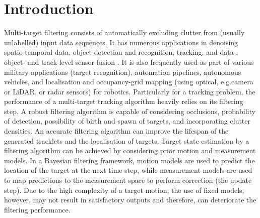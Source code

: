 \documentclass[runningheads]{llncs}
\begin{document}
\section{Introduction}
Multi-target filtering consists of automatically excluding clutter from (usually unlabelled) input data sequences. It has numerous applications in denoising spatio-temporal data, object detection and recognition, tracking, and data-, object- and track-level sensor fusion \cite{Vo:2005,Vo:2014,Fantacci:2018}. It is also frequently used as part of various military applications (target recognition), automation pipelines, autonomous vehicles, and localisation and occupancy-grid mapping (using optical, e.g.\stereo camera or LiDAR, or radar sensors) for robotics.
Particularly for a tracking problem, the performance of a multi-target tracking algorithm heavily relies on its filtering step. A robust filtering algorithm
is capable of considering occlusions, probability of detection, possibility of birth and spawn of targets, and incorporating clutter densities. 
An accurate filtering algorithm can improve the lifespan of the generated tracklets and the localisation of targets.
Target state estimation by a filtering algorithm can be achieved by considering prior motion and measurement models. In a Bayesian filtering framework, motion models are used to predict the location of the target at the next time step, while measurement models are used to map predictions to the measurement space to perform correction (the update step).
Due to the high complexity of a target motion, the use of fixed models, however, may not result in satisfactory outputs and therefore, can deteriorate the filtering performance.

%
\end{document}
